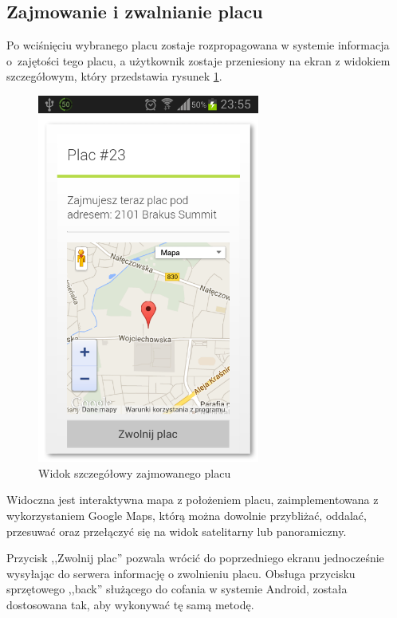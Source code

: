 \documentclass[twoside,a4paper,openright,12pt]{book}
\begin{document}
\subsection{Zajmowanie i zwalnianie placu}

Po wciśnięciu wybranego placu zostaje rozpropagowana w systemie informacja o~zajętości tego placu, a użytkownik zostaje przeniesiony na ekran z widokiem szczegółowym, który przedstawia rysunek \ref{fig:Zajmowany_plac_mobile}.

\begin{figure}[H]
\centering
\includegraphics[width=0.65\textwidth]{screenshots/android/szczegoly_placu.png}
\caption{Widok szczegółowy zajmowanego placu}
\label{fig:Zajmowany_plac_mobile}
\end{figure}

Widoczna jest interaktywna mapa z położeniem placu, zaimplementowana z wykorzystaniem Google Maps, którą można dowolnie przybliżać, oddalać, przesuwać oraz przełączyć się na widok satelitarny lub panoramiczny.

Przycisk ,,Zwolnij plac'' pozwala wrócić do poprzedniego ekranu jednocześnie wysyłając do serwera informację o zwolnieniu placu. Obsługa przycisku sprzętowego ,,back'' służącego do cofania w systemie Android, została dostosowana tak, aby wykonywać tę samą metodę.
\end{document}
